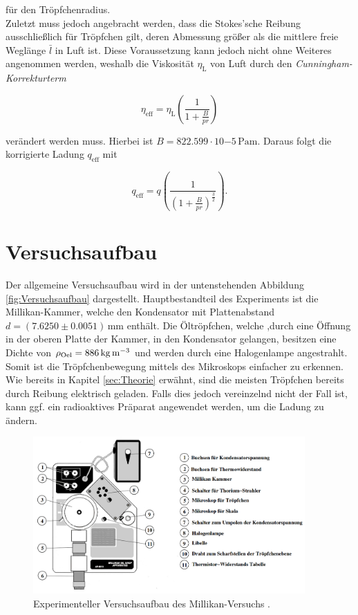 \noindent für den Tröpfchenradius.\\

\noindent Zuletzt muss jedoch angebracht werden, dass die Stokes'sche Reibung ausschließlich für Tröpfchen gilt, deren Abmessung
größer als die mittlere freie Weglänge $\bar{l}$ in Luft ist. Diese Voraussetzung kann jedoch nicht ohne Weiteres
angenommen werden, weshalb die Viskosität $\eta_\text{L}$ von Luft durch den \emph{Cunningham-Korrekturterm} 

\begin{equation*}
    \eta_\text{eff} = \eta_\text{L}\left(\frac{1}{1 + \frac{B}{pr}}\right)
\end{equation*}

\noindent verändert werden muss. Hierbei ist $B = 822.599\cdot{}10{-5}\,\unit{\pascal\meter}$. Daraus folgt die korrigierte 
Ladung $q_\text{eff}$ mit 

\begin{equation*}
    q_\text{eff} = q\left(\frac{1}{\left(1+\frac{B}{pr}\right)^{\frac{3}{2}}}\right).
\end{equation*}

\section{Versuchsaufbau}
\label{sec:Versuchsaufbau}

\noindent Der allgemeine Versuchsaufbau wird in der untenstehenden Abbildung \ref{fig:Versuchsaufbau} dargestellt. Hauptbestandteil des Experiments
ist die Millikan-Kammer, welche den Kondensator mit Plattenabstand $d = \left(7.6250\pm0.0051\right)
\,\unit{\milli\meter}$ enthält. Die Öltröpfchen, welche ,durch eine Öffnung in der oberen Platte der Kammer,
in den Kondensator gelangen, besitzen eine Dichte von $\rho_\text{Oel}= 886\,\unit[per-mode=reciprocal]{\kilo\gram\per\cubic\meter}$ und 
werden durch eine Halogenlampe angestrahlt. Somit ist die Tröpfchenbewegung mittels des Mikroskops einfacher zu erkennen. Wie bereits 
in Kapitel \ref{sec:Theorie} erwähnt, sind die meisten Tröpfchen bereits durch Reibung elektrisch geladen. Falls dies 
jedoch vereinzelnd nicht der Fall ist, kann ggf. ein radioaktives Präparat angewendet werden, um die Ladung zu ändern.

\begin{figure}
    \centering 
    \includegraphics[height=6cm]{Aufbau.png}
    \caption{Experimenteller Versuchsaufbau des Millikan-Versuchs \cite{Versuchsanleitung_v503}.}
    \label{fig:Aufbau}
\end{figure}

